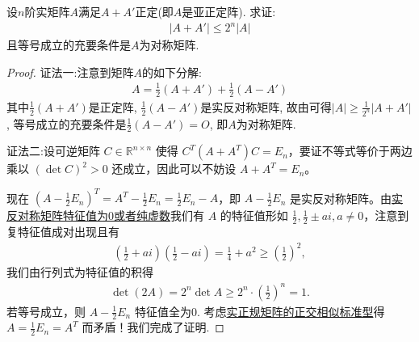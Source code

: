 \documentclass[../../main.tex]{subfiles}%
\begin{document}
\begin{proposition}\label{proposition:例9.115}
设\( n \)阶实矩阵\( A \)满足\( A+A' \)正定(即\( A \)是亚正定阵). 求证:
\begin{align*}
|A+A'| \leqslant 2^n|A|
\end{align*}
且等号成立的充要条件是\( A \)为对称矩阵.
\end{proposition}
\begin{proof}

{\color{blue}证法一:}注意到矩阵\( A \)的如下分解:
\begin{align*}
A = \frac{1}{2}(A+A') + \frac{1}{2}(A-A')
\end{align*}
其中\( \frac{1}{2}(A+A') \)是正定阵, \( \frac{1}{2}(A-A') \)是实反对称矩阵, 故由可得\( |A| \geqslant \frac{1}{2^n}|A+A'| \), 等号成立的充要条件是\( \frac{1}{2}(A-A') = O \), 即\( A \)为对称矩阵.

{\color{blue}证法二:}设可逆矩阵 \( C \in \mathbb{R}^{n \times n} \) 使得 \( C^T (A + A^T) C = E_n \)，要证不等式等价于两边乘以 \( (\det C)^2 > 0 \) 还成立，因此可以不妨设 \( A + A^T = E_n \)。

现在 \( (A - \frac{1}{2}E_n)^T = A^T - \frac{1}{2}E_n = \frac{1}{2}E_n - A \)，即 \( A - \frac{1}{2}E_n \) 是实反对称矩阵。由\hyperref[proposition:实对称(反称)阵的特征值]{实反对称矩阵特征值为0或者纯虚数}我们有 \( A \) 的特征值形如 \( \frac{1}{2}, \frac{1}{2} \pm ai, a \neq 0 \)，注意到复特征值成对出现且有
\begin{align*}
\left( \frac{1}{2} + ai \right) \left( \frac{1}{2} - ai \right) = \frac{1}{4} + a^2 \geqslant \left( \frac{1}{2} \right)^2,
\end{align*}
我们由行列式为特征值的积得
\begin{align*}
\det (2A) = 2^n \det A \geqslant 2^n \cdot \left( \frac{1}{2} \right)^n = 1.
\end{align*}
若等号成立，则 \( A - \frac{1}{2}E_n \) 特征值全为0. 考虑\hyperref[theorem:实正规矩阵的正交相似标准型]{实正规矩阵的正交相似标准型}得 \( A = \frac{1}{2}E_n = A^T \) 而矛盾！我们完成了证明.

\end{proof}
\end{document}
